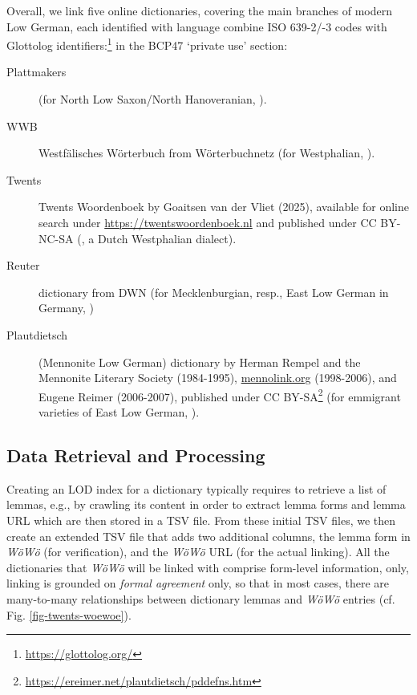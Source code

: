 \noindent
Overall, we link five online dictionaries, covering the main branches of modern Low German, each identified with language combine ISO 639-2/-3 codes with Glottolog identifiers:\footnote{\url{https://glottolog.org/}} in the BCP47 `private use' section: 

\begin{description}
\item[Plattmakers] (for North Low Saxon/North Hanoveranian, ).
\item[WWB] Westfälisches Wörterbuch from Wörterbuchnetz (for Westphalian, ).
\item[Twents] Twents Woordenboek by Goaitsen van der Vliet (2025), available for online search under \url{https://twentswoordenboek.nl} and published under CC BY-NC-SA (, a Dutch Westphalian dialect).
\item[Reuter] dictionary from DWN (for Mecklenburgian, resp., East Low German in Germany, )
\item[Plautdietsch] (Mennonite Low German) dictionary by Herman Rempel and the Mennonite Literary Society (1984-1995), \url{mennolink.org} (1998-2006), and Eugene Reimer (2006-2007), published under CC BY-SA\footnote{\url{https://ereimer.net/plautdietsch/pddefns.htm}} (for emmigrant varieties of East Low German, ). 
\end{description}

\subsection{Data Retrieval and Processing}

Creating an LOD index for a dictionary typically requires to retrieve a list of lemmas, e.g., by crawling its content in order to extract lemma forms and lemma URL which are then stored in a TSV file. 
From these initial TSV files, we then create an extended TSV file that adds two additional columns, the lemma form in \emph{WöWö} (for verification), and the \emph{WöWö} URL (for the actual linking). All the dictionaries that \emph{WöWö} will be linked with comprise form-level information, only, linking is grounded on \emph{formal agreement} only, so that in most cases, there are many-to-many relationships between dictionary lemmas and \emph{WöWö} entries (cf. Fig. \ref{fig-twents-woewoe}).

